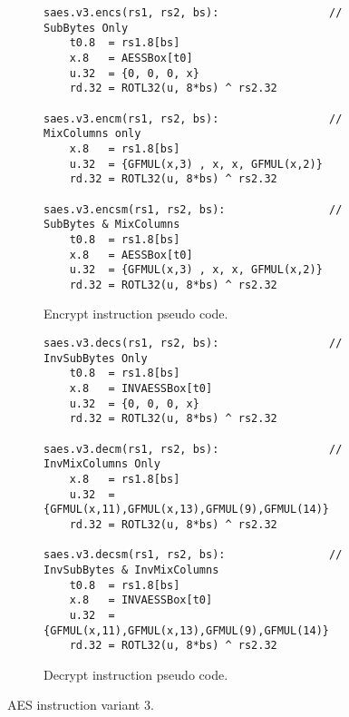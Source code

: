 \begin{figure}

\begin{subfigure}[b]{1.0\textwidth}
\begin{lstlisting}
saes.v3.encs(rs1, rs2, bs):                 // SubBytes Only
    t0.8  = rs1.8[bs]
    x.8   = AESSBox[t0]
    u.32  = {0, 0, 0, x}
    rd.32 = ROTL32(u, 8*bs) ^ rs2.32

saes.v3.encm(rs1, rs2, bs):                 // MixColumns only
    x.8   = rs1.8[bs]
    u.32  = {GFMUL(x,3) , x, x, GFMUL(x,2)}
    rd.32 = ROTL32(u, 8*bs) ^ rs2.32

saes.v3.encsm(rs1, rs2, bs):                // SubBytes & MixColumns
    t0.8  = rs1.8[bs]
    x.8   = AESSBox[t0]
    u.32  = {GFMUL(x,3) , x, x, GFMUL(x,2)}
    rd.32 = ROTL32(u, 8*bs) ^ rs2.32
\end{lstlisting}
\caption{Encrypt instruction pseudo code.}
\label{fig:pesudo:aes:v3:enc}
\end{subfigure}

\begin{subfigure}[b]{1.0\textwidth}
\begin{lstlisting}
saes.v3.decs(rs1, rs2, bs):                 // InvSubBytes Only
    t0.8  = rs1.8[bs]
    x.8   = INVAESSBox[t0]
    u.32  = {0, 0, 0, x}
    rd.32 = ROTL32(u, 8*bs) ^ rs2.32

saes.v3.decm(rs1, rs2, bs):                 // InvMixColumns Only
    x.8   = rs1.8[bs]
    u.32  = {GFMUL(x,11),GFMUL(x,13),GFMUL(9),GFMUL(14)}
    rd.32 = ROTL32(u, 8*bs) ^ rs2.32

saes.v3.decsm(rs1, rs2, bs):                // InvSubBytes & InvMixColumns
    t0.8  = rs1.8[bs]
    x.8   = INVAESSBox[t0]
    u.32  = {GFMUL(x,11),GFMUL(x,13),GFMUL(9),GFMUL(14)}
    rd.32 = ROTL32(u, 8*bs) ^ rs2.32
\end{lstlisting}
\caption{Decrypt instruction pseudo code.}
\label{fig:pesudo:aes:v3:dec}
\end{subfigure}
\caption{AES instruction variant 3.}
\label{fig:pseudo:aes:v3}
\end{figure}
